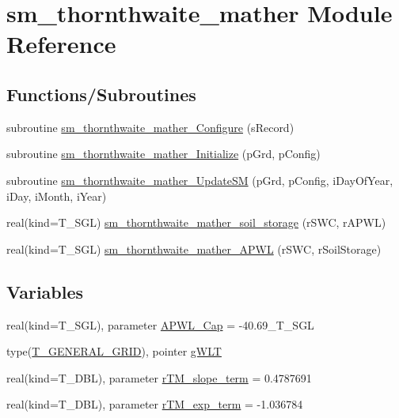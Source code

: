 \hypertarget{namespacesm__thornthwaite__mather}{
\section{sm\_\-thornthwaite\_\-mather Module Reference}
\label{namespacesm__thornthwaite__mather}
}
\subsection*{Functions/Subroutines}
\begin{DoxyCompactItemize}
\item 
subroutine \hyperlink{namespacesm__thornthwaite__mather_a4148064c8f4adaf87f34a3695f33063b}{sm\_\-thornthwaite\_\-mather\_\-Configure} (sRecord)
\item 
subroutine \hyperlink{namespacesm__thornthwaite__mather_a75c8bba39d7a0fd7bf8b7f67cfa44998}{sm\_\-thornthwaite\_\-mather\_\-Initialize} (pGrd, pConfig)
\item 
subroutine \hyperlink{namespacesm__thornthwaite__mather_a233ae5f65335221fe1cfeefbc50571cf}{sm\_\-thornthwaite\_\-mather\_\-UpdateSM} (pGrd, pConfig, iDayOfYear, iDay, iMonth, iYear)
\item 
real(kind=T\_\-SGL) \hyperlink{namespacesm__thornthwaite__mather_affdc1e74886e00b012b8f2ddf3be6ef2}{sm\_\-thornthwaite\_\-mather\_\-soil\_\-storage} (rSWC, rAPWL)
\item 
real(kind=T\_\-SGL) \hyperlink{namespacesm__thornthwaite__mather_a15c8accae90f6aec49dbb1ffcd53409c}{sm\_\-thornthwaite\_\-mather\_\-APWL} (rSWC, rSoilStorage)
\end{DoxyCompactItemize}
\subsection*{Variables}
\begin{DoxyCompactItemize}
\item 
real(kind=T\_\-SGL), parameter \hyperlink{namespacesm__thornthwaite__mather_a3c2fee3b14d954659c5d846b6277217c}{APWL\_\-Cap} = -\/40.69\_\-T\_\-SGL
\item 
type(\hyperlink{typetypes_1_1_t___g_e_n_e_r_a_l___g_r_i_d}{T\_\-GENERAL\_\-GRID}), pointer \hyperlink{namespacesm__thornthwaite__mather_afc44d31c08d31d440d84bf36d87547f4}{gWLT}
\item 
real(kind=T\_\-DBL), parameter \hyperlink{namespacesm__thornthwaite__mather_aacf86966e860d48ccfc3dd81a5d95386}{rTM\_\-slope\_\-term} = 0.4787691
\item 
real(kind=T\_\-DBL), parameter \hyperlink{namespacesm__thornthwaite__mather_a001111c742752b811654e00f9ae3fab4}{rTM\_\-exp\_\-term} = -\/1.036784
\end{DoxyCompactItemize}


